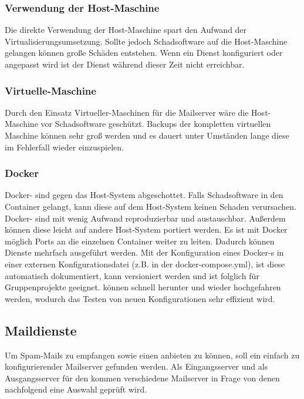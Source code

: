 \documentclass[a4paper,11pt,singlespacing]{article}
\begin{document}
		\subsubsection{Verwendung der Host-Maschine}\label{Verwendung der Host-Maschine}
			Die direkte Verwendung der Host-Maschine spart den Aufwand der Virtualisierungsumsetzung.
			Sollte jedoch Schadsoftware auf die Host-Maschine gelangen können gro{\ss}e Schäden entstehen.
			Wenn ein Dienst konfiguriert oder angepasst wird ist der Dienst während dieser Zeit nicht erreichbar.

		\subsubsection{Virtuelle-Maschine}\label{Virtual-Maschine}
			Durch den Einsatz Virtueller-Maschinen für die Mailserver wäre die Host-Maschine vor Schadsoftware geschützt.
			Backups der kompletten virtuellen Maschine können sehr groß werden und es dauert unter Umständen lange diese im Fehlerfall wieder einzuspielen.

		\subsubsection{Docker}\label{Docker}
			Docker- sind gegen das Host-System abgeschottet. Falls Schadsoftware in den Container gelangt, kann diese auf dem Host-System keinen Schaden verursachen.
			Docker- sind mit wenig Aufwand reproduzierbar und austauschbar. Au{\ss}erdem können diese leicht auf andere Host-System portiert werden.
			Es ist mit Docker möglich Ports an die einzelnen Container weiter zu leiten. Dadurch können Dienste mehrfach ausgeführt werden.
			Mit der Konfiguration eines Docker-s in einer externen Konfigurationsdatei (z.B. in der docker-compose.yml), ist diese automatisch dokumentiert, kann versioniert werden und ist folglich für Gruppenprojekte geeignet.
			 können schnell herunter und wieder hochgefahren werden, wodurch das Testen von neuen Konfigurationen sehr effizient wird.

	\subsection{Maildienste}\label{sec:Mailserver}
		Um Spam-Mails zu empfangen sowie einen  anbieten zu können, soll ein einfach zu konfigurierender Mailserver gefunden werden.
		Als Eingangsserver und als Ausgangsserver für den  kommen verschiedene Mailserver in Frage von denen nachfolgend eine Auswahl geprüft wird.
\end{document}
